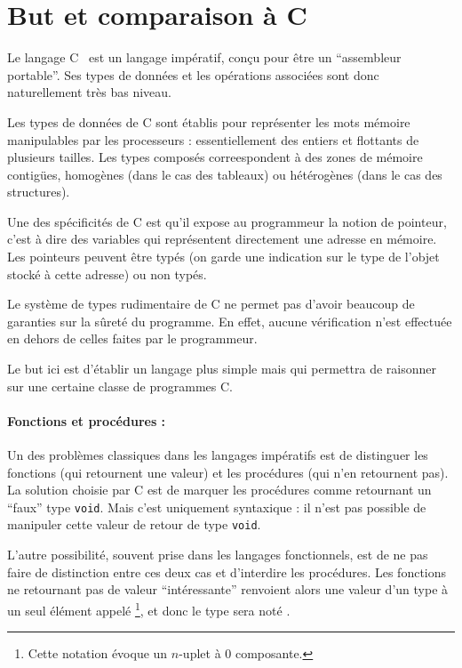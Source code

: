 \section{But et comparaison à C}

Le langage C~\cite{KandR} est un langage impératif, conçu pour être un
``assembleur portable''. Ses types de données et les opérations associées sont
donc naturellement très bas niveau.

Les types de données de C sont établis pour représenter les mots mémoire
manipulables par les processeurs : essentiellement des entiers et flottants de
plusieurs tailles. Les types composés correespondent à des zones de mémoire
contigües, homogènes (dans le cas des tableaux) ou hétérogènes (dans le cas des
structures).

Une des spécificités de C est qu'il expose au programmeur la notion de pointeur,
c'est à dire des variables qui représentent directement une adresse en mémoire.
Les pointeurs peuvent être typés (on garde une indication sur le type de l'objet
stocké à cette adresse) ou non typés.

Le système de types rudimentaire de C ne permet pas d'avoir beaucoup de
garanties sur la sûreté du programme. En effet, aucune vérification n'est
effectuée en dehors de celles faites par le programmeur.

Le but ici est d'établir un langage plus simple mais qui permettra de raisonner
sur une certaine classe de programmes C.


\paragraph{Fonctions et procédures :} Un des problèmes classiques dans les
langages impératifs est de distinguer les fonctions (qui retournent une valeur)
et les procédures (qui n'en retournent pas). La solution choisie par C est de
marquer les procédures comme retournant un ``faux'' type \texttt{void}. Mais
c'est uniquement syntaxique : il n'est pas possible de manipuler cette valeur de
retour de type \texttt{void}.

L'autre possibilité, souvent prise dans les langages fonctionnels, est de ne pas
faire de distinction entre ces deux cas et d'interdire les procédures. Les
fonctions ne retournant pas de valeur ``intéressante'' renvoient alors une
valeur d'un type à un seul élément appelé \eUnit\footnote{Cette notation évoque
un $n$-uplet à 0 composante.}, et donc le type sera noté \tUnit.

